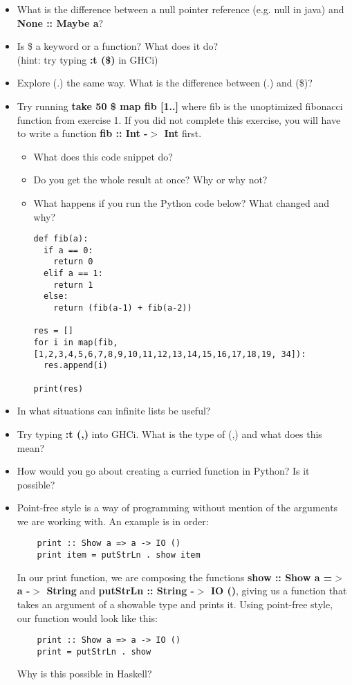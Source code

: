 \documentclass{article}
\begin{document}
\begin{itemize}
    \item What is the difference between a null pointer reference (e.g. null in java) and \textbf{None :: Maybe a}?
    \item Is \$ a keyword or a function? What does it do?\\ (hint: try typing \textbf{:t (\$)} in GHCi)
    \item Explore (.) the same way. What is the difference between (.) and (\$)?
    \item Try running \textbf{take 50 \$ map fib [1..]} where fib is the unoptimized fibonacci function from exercise 1. If you did not complete this exercise, you will have to write a function \textbf{fib :: Int -$>$ Int} first.\\
    \begin{itemize}
        \item What does this code snippet do?
        \item Do you get the whole result at once? Why or why not?
        \item What happens if you run the Python code below? What changed and why?
\lstset{language=Python}
\begin{lstlisting}
def fib(a):
  if a == 0:
    return 0
  elif a == 1:
    return 1
  else:
    return (fib(a-1) + fib(a-2))

res = []
for i in map(fib, [1,2,3,4,5,6,7,8,9,10,11,12,13,14,15,16,17,18,19, 34]):
  res.append(i)

print(res)
\end{lstlisting}
    \end{itemize}
    \item In what situations can infinite lists be useful?
    \item Try typing \textbf{:t (,)} into GHCi. What is the type of (,) and what does this mean?
    \item How would you go about creating a curried function in Python? Is it possible?
    \item Point-free style is a way of programming without mention of the arguments we are working with. An example is in order:
    \lstset{language=Haskell}
    \begin{lstlisting}
    print :: Show a => a -> IO ()
    print item = putStrLn . show item
    \end{lstlisting}
    In our print function, we are composing the functions \textbf{show :: Show a =$>$ a -$>$ String} and \textbf{putStrLn :: String -$>$ IO ()}, giving us a function that takes an argument of a showable type and prints it. Using point-free style, our function would look like this:
    \lstset{language=Haskell}
    \begin{lstlisting}
    print :: Show a => a -> IO ()
    print = putStrLn . show
    \end{lstlisting}
    Why is this possible in Haskell?
\end{itemize}
\end{document}
